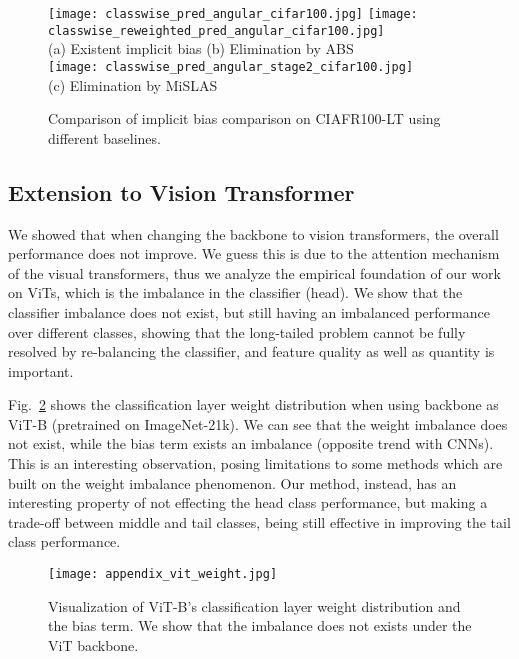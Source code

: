 \documentclass[10pt,twocolumn,letterpaper]{article}
\begin{document}
\begin{figure}[h]
  \centering
  \texttt{[image: classwise\_pred\_angular\_cifar100.jpg]}
  \texttt{[image: classwise\_reweighted\_pred\_angular\_cifar100.jpg]} \\
  (a) Existent implicit bias \qquad  (b) Elimination by ABS \\
   \texttt{[image: classwise\_pred\_angular\_stage2\_cifar100.jpg]} \\
   (c) Elimination by MiSLAS \\
   \vspace{-5pt}
   \caption{Comparison of implicit bias comparison on CIAFR100-LT using different baselines.}
   \label{fig:appendix_cifar100_bias_compare}
   \vspace{-5pt}
\end{figure}

\subsection{Extension to Vision Transformer}
We showed that when changing the backbone to vision transformers, the overall performance does not improve. We guess this is due to the attention mechanism of the visual transformers, thus we analyze the empirical foundation of our work on ViTs, which is the imbalance in the classifier (head). We show that the classifier imbalance does not exist, but still having an imbalanced performance over different classes, showing that the long-tailed problem cannot be fully resolved by re-balancing the classifier, and feature quality as well as quantity is important. 

Fig.~\ref{fig:vit_weight} shows the classification layer weight distribution when using backbone as ViT-B (pretrained on ImageNet-21k). We can see that the weight imbalance does not exist, while the bias term exists an imbalance (opposite trend with CNNs). This is an interesting observation, posing limitations to some methods which are built on the weight imbalance phenomenon. Our method, instead, has an interesting property of not effecting the head class performance, but making a trade-off between middle and tail classes, being still effective in improving the tail class performance.

\begin{figure}[h]
  \centering
  \texttt{[image: appendix\_vit\_weight.jpg]}\vspace{-5pt}
   \caption{Visualization of ViT-B's classification layer weight distribution and the bias term. We show that the imbalance does not exists under the ViT backbone.}
   \label{fig:vit_weight}
   \vspace{-5pt}
\end{figure}
\end{document}
